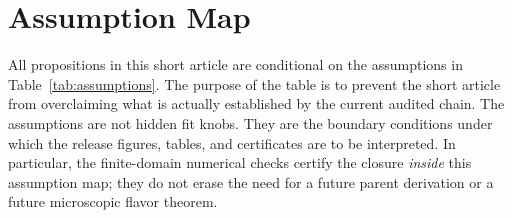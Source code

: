\documentclass[11pt,a4paper]{article}
\begin{document}
\section{Assumption Map}
\label{sec:assumptions}

All propositions in this short article are conditional on the assumptions in Table~\ref{tab:assumptions}.
The purpose of the table is to prevent the short article from overclaiming what is actually established by the current audited chain.
The assumptions are not hidden fit knobs.
They are the boundary conditions under which the release figures, tables, and certificates are to be interpreted.
In particular, the finite-domain numerical checks certify the closure \emph{inside} this assumption map; they do not erase the need for a future parent derivation or a future microscopic flavor theorem.
\end{document}
